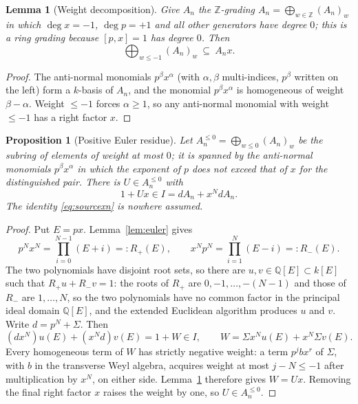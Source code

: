\documentclass[11pt]{article}
\theoremstyle{plain}
\newtheorem{lemma}[theorem]{Lemma}
\newtheorem{proposition}[theorem]{Proposition}
\theoremstyle{definition}
\theoremstyle{remark}
\theoremstyle{plain}
\newcommand{\bbZ}{\mathbb{Z}}
\newcommand{\bbQ}{\mathbb{Q}}
\begin{document}
\begin{lemma}[Weight decomposition]\label{lem:weight}
Give $A_n$ the $\bbZ$-grading $A_n=\bigoplus_{w\in\bbZ}(A_n)_w$ in which
$\deg x=-1$, $\deg p=+1$ and all other generators have degree $0$; this is a
ring grading because $[p,x]=1$ has degree $0$. Then
\[
  \bigoplus_{w\le -1}(A_n)_w\ \subseteq\ A_nx .
\]
\end{lemma}

\begin{proof}
The anti-normal monomials $p^{\beta}x^{\alpha}$ (with $\alpha,\beta$ multi-indices,
$p^\beta$ written on the left) form a $k$-basis of $A_n$, and the monomial
$p^{\beta}x^{\alpha}$ is homogeneous of weight $\beta-\alpha$. Weight
$\le-1$ forces $\alpha\ge1$, so any anti-normal monomial with weight $\leq -1$ has a right factor $x$.
\end{proof}

\begin{proposition}[Positive Euler residue]\label{prop:residue}
Let $A_n^{\leq0}=\bigoplus_{w\leq0}(A_n)_w$ be the subring of elements of
weight at most $0$; it is spanned by the anti-normal monomials $p^\beta x^\alpha$
in which the exponent of $p$ does not exceed that of $x$ for the
distinguished pair. There is $U\in A_n^{\leq0}$
with
\begin{equation}\label{eq:residue}
  1+Ux\in I=dA_n+x^NdA_n .
\end{equation}
The identity \eqref{eq:sourcexn} is nowhere assumed.
\end{proposition}

\begin{proof}
Put $E=px$. Lemma~\ref{lem:euler} gives
\[
 p^Nx^N=\prod_{i=0}^{N-1}(E+i)=:R_+(E),\qquad
 x^Np^N=\prod_{i=1}^{N}(E-i)=:R_-(E).
\]
The two polynomials have disjoint root sets, so there are
$u,v\in\bbQ[E]\subset k[E]$ such that $R_+u+R_-v=1$: the roots of $R_+$ are
$0,-1,\dots,-(N-1)$ and those of $R_-$ are $1,\dots,N$, so the two polynomials
have no common factor in the principal ideal domain $\bbQ[E]$, and the
extended Euclidean algorithm produces $u$ and $v$.
Write
$d=p^N+\Sigma$. Then
\[
 (dx^N)u(E)+(x^Nd)v(E)=1+W\in I,
 \qquad
 W=\Sigma x^Nu(E)+x^N\Sigma v(E).
\]
Every homogeneous term of $W$ has strictly negative weight: a term
$p^jbx^r$ of $\Sigma$, with $b$ in the transverse Weyl algebra, acquires
weight at most $j-N\leq -1$ after multiplication by $x^N$, on either side.
Lemma~\ref{lem:weight} therefore gives $W=Ux$. Removing the final right factor
$x$ raises the weight by one, so $U\in A_n^{\leq0}$.
\end{proof}
\end{document}

